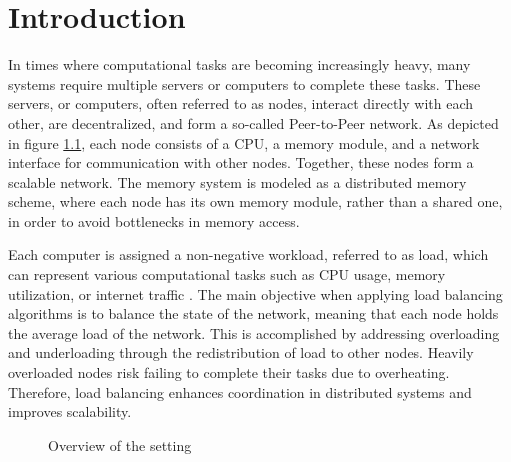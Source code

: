 \chapter{Introduction}\label{chap:introduction}
In times where computational tasks are becoming increasingly heavy, many systems require multiple servers or computers to complete these tasks. These servers, or computers, often referred to as nodes, interact directly with each other, are decentralized, and form a so-called Peer-to-Peer network. As depicted in figure \ref{fig:setting}, each node consists of a CPU, a memory module, and a network interface for communication with other nodes. Together, these nodes form a scalable network. The memory system is modeled as a distributed memory scheme, where each node has its own memory module, rather than a shared one, in order to avoid bottlenecks in memory access. \cite{ChengzhongFrancis}

Each computer is assigned a non-negative workload, referred to as load, which can represent various computational tasks such as CPU usage, memory utilization, or internet traffic \cite{Dinitz2023DAB}. The main objective when applying load balancing algorithms is to balance the state of the network, meaning that each node holds the average load of the network. This is accomplished by addressing overloading and underloading through the redistribution of load to other nodes. Heavily overloaded nodes risk failing to complete their tasks due to overheating. Therefore, load balancing enhances coordination in distributed systems and improves scalability.

\begin{figure}[]
    \centering
    \caption{Overview of the setting}
    \label{fig:setting}
\end{figure}

